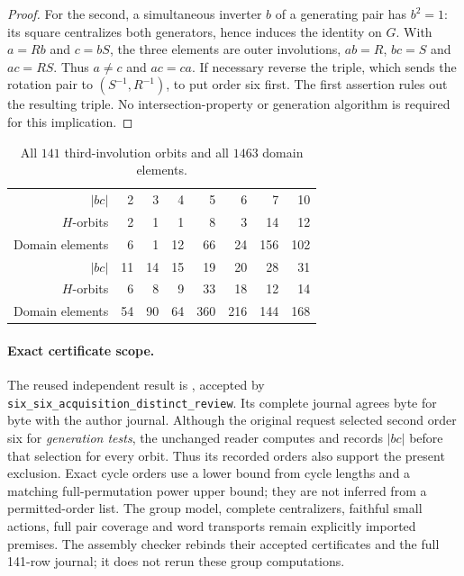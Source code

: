 \documentclass[11pt,a4paper]{article}
\begin{document}
\begin{proof}
For the second, a simultaneous inverter $b$ of a generating pair has
$b^2=1$: its square centralizes both generators, hence induces the
identity on $G$. With $a=Rb$ and $c=bS$, the three elements are outer
involutions, $ab=R$, $bc=S$ and $ac=RS$. Thus $a\ne c$ and $ac=ca$.
If necessary reverse the triple, which sends the rotation pair to
$(S^{-1},R^{-1})$, to put order six first. The first assertion rules out
the resulting triple. No intersection-property or generation algorithm
is required for this implication.
\end{proof}

\begin{table}[h]
\centering\small
\begin{tabular}{r*{7}{r}}
\toprule
$|bc|$&2&3&4&5&6&7&10\\
$H$-orbits&2&1&1&8&3&14&12\\
Domain elements&6&1&12&66&24&156&102\\
\midrule
$|bc|$&11&14&15&19&20&28&31\\
$H$-orbits&6&8&9&33&18&12&14\\
Domain elements&54&90&64&360&216&144&168\\
\bottomrule
\end{tabular}
\caption{All $141$ third-involution orbits and all $1463$ domain elements.}
\label{orders}
\end{table}

\paragraph{Exact certificate scope.}
The reused independent result is
,
accepted by \texttt{six\_six\_acquisition\_distinct\_review}.
Its complete journal agrees byte for byte with the author journal.
Although the original request selected second order six for
\emph{generation tests}, the unchanged reader computes and records
$|bc|$ before that selection for every orbit. Thus its recorded orders
also support the present exclusion. Exact cycle orders use a lower
bound from cycle lengths and a matching full-permutation power upper
bound; they are not inferred from a permitted-order list.
The group model, complete centralizers, faithful small actions, full
pair coverage and word transports remain explicitly imported premises.
The assembly checker rebinds their accepted certificates and the full
141-row journal; it does not rerun these group computations.
\end{document}
